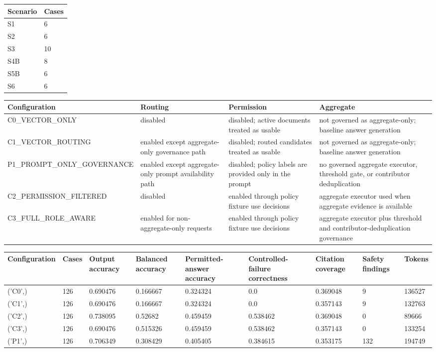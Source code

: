 \begin{tabular}{ll}
\toprule
Scenario & Cases \\
\midrule
S1 & 6 \\
S2 & 6 \\
S3 & 10 \\
S4B & 8 \\
S5B & 6 \\
S6 & 6 \\
\bottomrule
\end{tabular}

\begin{tabular}{llll}
\toprule
Configuration & Routing & Permission & Aggregate \\
\midrule
C0\_VECTOR\_ONLY & disabled & disabled; active documents treated as usable & not governed as aggregate-only; baseline answer generation \\
C1\_VECTOR\_ROUTING & enabled except aggregate-only governance path & disabled; routed candidates treated as usable & not governed as aggregate-only; baseline answer generation \\
P1\_PROMPT\_ONLY\_GOVERNANCE & enabled except aggregate-only prompt availability path & disabled; policy labels are provided only in the prompt & no governed aggregate executor, threshold gate, or contributor deduplication \\
C2\_PERMISSION\_FILTERED & disabled & enabled through policy fixture use decisions & aggregate executor used when aggregate evidence is available \\
C3\_FULL\_ROLE\_AWARE & enabled for non-aggregate-only requests & enabled through policy fixture use decisions & aggregate executor plus threshold and contributor-deduplication governance \\
\bottomrule
\end{tabular}

\begin{tabular}{lllllllll}
\toprule
Configuration & Cases & Output accuracy & Balanced accuracy & Permitted-answer accuracy & Controlled-failure correctness & Citation coverage & Safety findings & Tokens \\
\midrule
('C0',) & 126 & 0.690476 & 0.166667 & 0.324324 & 0.0 & 0.369048 & 9 & 136527 \\
('C1',) & 126 & 0.690476 & 0.166667 & 0.324324 & 0.0 & 0.357143 & 9 & 132763 \\
('C2',) & 126 & 0.738095 & 0.52682 & 0.459459 & 0.538462 & 0.369048 & 0 & 89666 \\
('C3',) & 126 & 0.690476 & 0.515326 & 0.459459 & 0.538462 & 0.357143 & 0 & 133254 \\
('P1',) & 126 & 0.706349 & 0.308429 & 0.405405 & 0.384615 & 0.353175 & 132 & 194749 \\
\bottomrule
\end{tabular}

